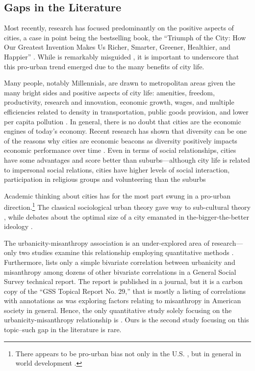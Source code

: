 \documentclass[11pt, letterpaper]{article}
\begin{document}
\begin{spacing}{1.4}
\section*{Gaps in the Literature} 

Most recently, research has focused predominantly on the positive aspects of cities, a case in point being the bestselling book, the ``Triumph of the City: How Our Greatest Invention Makes Us Richer, Smarter, Greener, Healthier, and Happier'' \citep{glaeser11}. While \citet{glaeser11} is remarkably misguided  \citep{aokCityBook15,peck16}, it is important to underscore that this pro-urban trend emerged due to the many benefits of city life. 
   
Many people, notably  Millennials, are drawn to metropolitan areas \citep{aok-swbGenYcity18} given the many bright sides and positive aspects of city life: amenities, freedom, productivity, research and innovation, economic growth, wages, and multiple efficiencies related to
density in transportation, public goods provision, and lower per capita pollution \citep{tonnies57,osullivan09,meyer13,rosenthal02,bettencourt10}.
In general, there is no doubt that cities are the economic engines of today's
economy. Recent research has shown that diversity can be one of the reasons why
cities are economic beacons as diversity positively impacts economic performance
over time \citep[e.g.,][]{rodriguez2019does}. Even in terms of social
relationships, cities have some advantages and score better than
suburbs---although city life is related to impersonal social relations, cities have higher levels of social interaction, participation in religious groups and volunteering than the suburbs \citep{nguyen10,mazumdar18}
%


Academic thinking about cities has for the most part swung in a pro-urban direction.\footnote{There appears to be pro-urban bias not only in the U.S. \cite{hansonCityJournalautumn15}, but in general in world development \citep{lipton77}.} The classical sociological urban theory \citep{wirth38,milgram70,park15,park84,simmel03,tonnies57} gave way to
  sub-cultural theory \citep{fischer75,fischer95,wilson85, palisi83}, while debates about the optimal size of a city \citep{richardson72,singell74,alonso60,alonso71,elgin75,capello00} emanated in the-bigger-the-better ideology \citep{glaeser11}. 


The urbanicity-misanthropy association is an under-explored area of research---only two studies examine this relationship employing quantitative methods \citep{wilson85,smith97}. Furthermore, \citet{smith97} lists only a simple bivariate correlation between urbanicity and misanthropy among dozens of other bivariate correlations in a General Social Survey technical report. The report is published in a journal, but it is a carbon copy of the ``GSS Topical Report No. 29,'' that is mostly a listing of correlations with annotations as \citet{smith97} was exploring factors relating to misanthropy in American society in general.
Hence, the only quantitative study solely focusing on the urbanicity-misanthropy
relationship is \citet{wilson85}. Ours is the second study focusing on this topic--such gap in the literature is rare.


\end{spacing}
\end{document}
